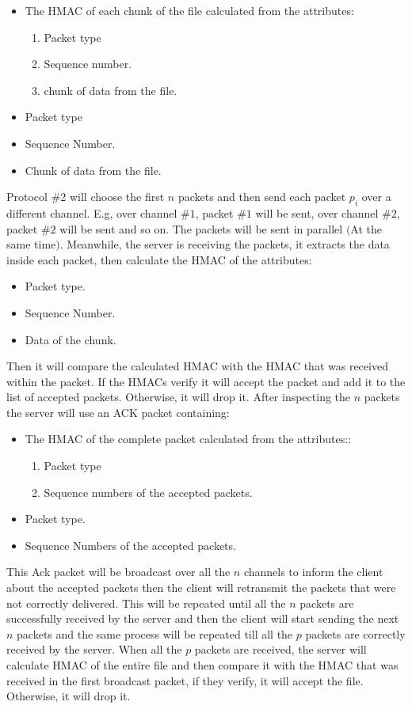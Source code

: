 \documentclass[main.tex]{subfiles}
\begin{document}
\begin{itemize}
\item The HMAC of each chunk of the file calculated from the attributes:
\begin{enumerate}
\item Packet type
\item Sequence number.
\item chunk of data from the file.
\end{enumerate}
\item Packet type
\item Sequence Number.
\item Chunk of data from the file.
\end{itemize} Protocol \#2 will choose the first $n$ packets and then send each packet $p_{i}$ over a different channel. E.g, over channel $\#1$, packet $\#1$ will be sent, over channel $\#2$, packet $\#2$ will be sent and so on. The packets will be sent in parallel $($At the same time$)$. Meanwhile, the server is receiving the packets, it extracts the data inside each packet, then calculate the HMAC of the attributes: \begin{itemize}
\item Packet type.
\item Sequence Number.
\item Data of the chunk.
\end{itemize} Then it will compare the calculated HMAC with the HMAC that was received within the packet. If the HMACs verify it will accept the packet and add it to the list of accepted packets. Otherwise, it will drop it. After inspecting the $n$ packets the server will use an ACK packet containing:
\begin{itemize}
\item The HMAC of the complete packet calculated from the attributes::
\begin{enumerate}
\item Packet type
\item Sequence numbers of the accepted packets.
\end{enumerate}
\item Packet type.
\item Sequence Numbers of the accepted packets.
\end{itemize} This Ack packet will be broadcast over all the $n$ channels to inform the client about the accepted packets then the client will retransmit the packets that were not correctly delivered. This will be repeated until all the $n$ packets are successfully received by the server and then the client will start sending the next $n$ packets and the same process will be repeated till all the $p$ packets are correctly received by the server. When all the $p$ packets are received, the server will calculate HMAC of the entire file and then compare it with the HMAC that was received in the first broadcast packet, if they verify, it will accept the file. Otherwise, it will drop it.
\end{document}
